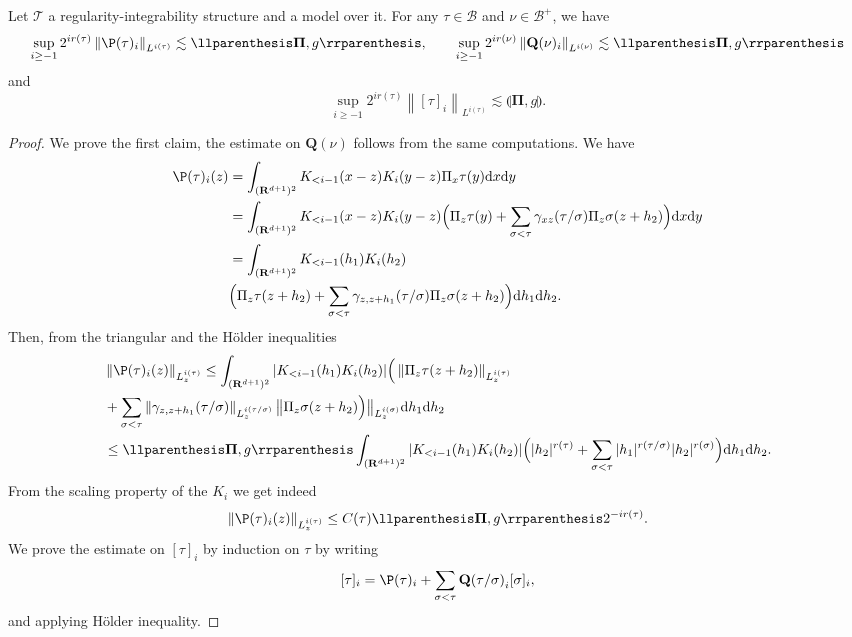 \documentclass[11pt]{preprint}
\newcommand{\mcB}{\mathcal{B}}
\def\PPi{\boldsymbol{\Pi}}
\newcommand{\bfR}{\mathbf{R}}
\newcommand{\scrT}{\mathscr{T}}
\newcommand{\norme}[1]{\left\lVert #1 \right\lVert}
\newcommand{\ddd}{ \text{d} }
\begin{document}
\begin{lemma}\label{lem_crochets_Besov}
	Let $\scrT$ a regularity-integrability structure and a model over it.
	For any $\tau\in\mcB$ and $\nu\in\mcB^+$, we have
	$$
	\sup_{i\geq-1}2^{ir(\tau)}\norme{\P(\tau)_i}_{L^{i(\tau)}} \lesssim  \llparenthesis \PPi , g\rrparenthesis , \quad\quad \sup_{i\geq-1} 2^{ir(\nu)}\norme{{\bf Q}(\nu)_i}_{L^{i(\nu)}} \lesssim  \llparenthesis \PPi , g\rrparenthesis 
	$$
	and 
	$$
		\sup_{i\geq-1}2^{ir(\tau)}\norme{[\tau]_i}_{L^{i(\tau)}} \lesssim  \llparenthesis \PPi , g\rrparenthesis.
		$$
\end{lemma}
\begin{proof}
	We prove the first claim, the estimate on ${\mathbf{Q}(\nu)}$ follows from the same computations. We have 
	\begin{align*}
		 \P(\tau)_i(z) &= \int_{(\bfR^{d+1})^2} K_{<i-1}(x-z)K_i(y-z)\Pi_x\tau(y) \ddd x \ddd y 
		\\& =  \int_{(\bfR^{d+1})^2} K_{<i-1}(x-z)K_i(y-z)\Big(\Pi_z\tau(y)+ \sum_{\sigma<\tau}\gamma_{xz}(\tau/\sigma)\Pi_z\sigma(z+h_2)\Big) \ddd x \ddd y
		\\
		&= \int_{(\bfR^{d+1})^2} K_{<i-1}(h_1)K_i(h_2) \\ & \Big(\Pi_z\tau(z+h_2)+ \sum_{\sigma<\tau}\gamma_{z,z+h_1}(\tau/\sigma)\Pi_z\sigma(z+h_2)\Big) \ddd h_1 \ddd h_2.
	\end{align*}
Then, from the triangular and the Hölder inequalities 
\begin{align*}
		& \norme{\P(\tau)_i(z)}_{L_z^{i(\tau)}} \leq \int_{(\bfR^{d+1})^2} |K_{<i-1}(h_1)K_i(h_2)|\Big(\norme{\Pi_z\tau(z+h_2)}_{L_z^{i(\tau)}}
		\\&+ \sum_{\sigma<\tau}\norme{\gamma_{z,z+h_1}(\tau/\sigma)}_{L_z^{i(\tau/\sigma)}}\big\lVert{\Pi_z\sigma(z+h_2)\Big)}\big\lVert_{L_z^{i(\sigma)}} \ddd h_1 \ddd h_2
		\\
		&\leq\llparenthesis \PPi , g\rrparenthesis  \int_{(\bfR^{d+1})^2} |K_{<i-1}(h_1)K_i(h_2)|\Big( |h_2|^{r(\tau)} + \sum_{\sigma<\tau}|h_1|^{r(\tau/\sigma)} |h_2|^{r(\sigma)} \Big) \ddd h_1 \ddd h_2.
\end{align*}
From the scaling property of  the $K_i$ we get indeed
$$
\norme{\P(\tau)_i(z)}_{L_z^{i(\tau)}} \leq C(\tau) \llparenthesis \PPi , g\rrparenthesis 2^{-ir(\tau)}.
$$
We prove the estimate on $[\tau]_i$ by induction on $\tau$ by writing 
$$
[\tau]_i = \P(\tau)_i + \sum_{\sigma<\tau} {\mathbf{Q}(\tau/\sigma)}_i [\sigma]_i,
$$
and applying Hölder inequality.
\end{proof}
\end{document}
